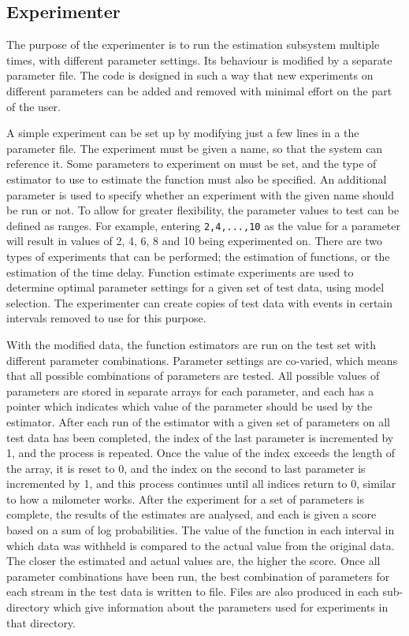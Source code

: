 \documentclass[a4paper,11pt]{article}
\begin{document}
\subsection{Experimenter}
\label{sec-6-9}

   The purpose of the experimenter is to run the estimation subsystem multiple
   times, with different parameter settings. Its behaviour is modified by a
   separate parameter file. The code is designed in such a way that new
   experiments on different parameters can be added and removed with minimal
   effort on the part of the user. 

   A simple experiment can be set up by modifying just a few lines in a the
   parameter file. The experiment must be given a name, so that the system can
   reference it. Some parameters to experiment on must be set, and the type of
   estimator to use to estimate the function must also be specified. An
   additional parameter is used to specify whether an experiment with the given
   name should be run or not. To allow for greater flexibility, the parameter
   values to test can be defined as ranges. For example, entering
   \texttt{2,4,...,10} as the value for a parameter will result in values of 2,
   4, 6, 8 and 10 being experimented on. There are two types of experiments that
   can be performed; the estimation of functions, or the estimation of the time
   delay. Function estimate experiments are used to determine optimal parameter
   settings for a given set of test data, using model selection. The
   experimenter can create copies of test data with events in certain intervals
   removed to use for this purpose.
   
   With the modified data, the function estimators are run on the test set with
   different parameter combinations. Parameter settings are co-varied, which
   means that all possible combinations of parameters are tested. All possible
   values of parameters are stored in separate arrays for each parameter, and
   each has a pointer which indicates which value of the parameter should be
   used by the estimator. After each run of the estimator with a given set of
   parameters on all test data has been completed, the index of the last
   parameter is incremented by 1, and the process is repeated. Once the value of
   the index exceeds the length of the array, it is reset to 0, and the index on
   the second to last parameter is incremented by 1, and this process continues
   until all indices return to 0, similar to how a milometer works. After the
   experiment for a set of parameters is complete, the results of the estimates
   are analysed, and each is given a score based on a sum of log
   probabilities. The value of the function in each interval in which data was
   withheld is compared to the actual value from the original data. The closer
   the estimated and actual values are, the higher the score. Once all parameter
   combinations have been run, the best combination of parameters for each
   stream in the test data is written to file. Files are also produced in each
   sub-directory which give information about the parameters used for
   experiments in that directory.
\end{document}
